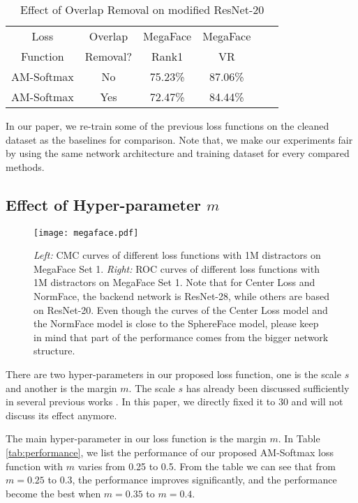 \documentclass[10pt,twocolumn,letterpaper]{article}
\begin{document}
\begin{table}[!htb]
	\centering
	\footnotesize
	\label{tab:overlap_removal}
	\begin{tabular}{cccccc}
		\toprule
		Loss & Overlap & MegaFace & MegaFace \\
		Function & Removal? & Rank1 & VR \\
		\midrule
AM-Softmax & No &  75.23\% & 87.06\%\\
		AM-Softmax & Yes & 72.47\% & 84.44\% \\
		\bottomrule
	\end{tabular}
	\vspace{2mm}
	\caption{Effect of Overlap Removal on modified ResNet-20}
\end{table}

In our paper, we re-train some of the previous loss functions on the cleaned dataset as the baselines for comparison. Note that, we make our experiments fair by using the same network architecture and training dataset for every compared methods.

\subsection{Effect of Hyper-parameter $m$}

\begin{figure*}
	\centering
	\texttt{[image: megaface.pdf]}
	\caption{ \emph{Left:} CMC curves of different loss functions with 1M distractors on MegaFace\cite{kemelmacher2016megaface} Set 1. \emph{Right:} ROC curves of different loss functions with 1M distractors on MegaFace\cite{kemelmacher2016megaface} Set 1. Note that for Center Loss and NormFace, the backend network is ResNet-28\cite{wen2016discriminative}, while others are based on ResNet-20\cite{liu2017sphereface}. Even though the curves of the Center Loss model and the NormFace model is close to the SphereFace model, please keep in mind that part of the performance comes from the bigger network structure. }
	\label{fig:megaface}
\end{figure*}

There are two hyper-parameters in our proposed loss function, one is the scale $s$ and another is the margin $m$. The scale $s$ has already been discussed sufficiently in several previous works \cite{wang2017normface, liu_2017_coco_v2, ranjan2017l2}. In this paper, we directly fixed it to $30$ and will not discuss its effect anymore.

The main hyper-parameter in our loss function is the margin $m$. In Table \ref{tab:performance}, we list the performance of our proposed AM-Softmax loss function with $m$ varies from 0.25 to 0.5. From the table we can see that from $m=0.25$ to $0.3$, the performance improves significantly, and the performance become the best when $m=0.35$ to $m=0.4$. 
\end{document}
